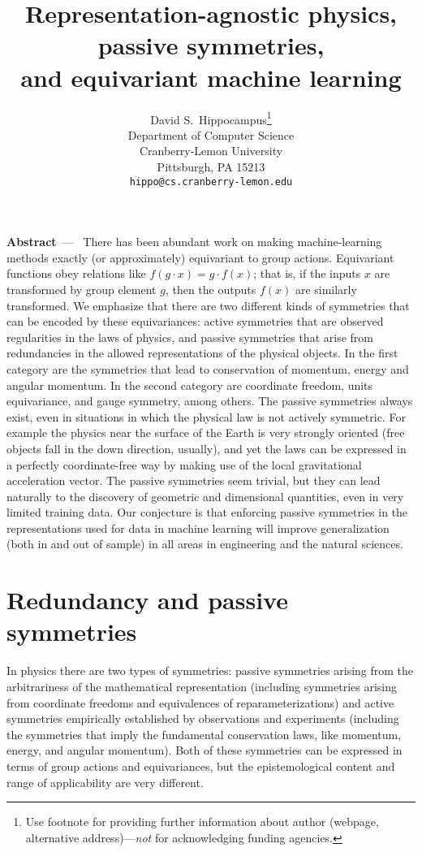 \documentclass{article}
\title{Representation-agnostic physics, passive symmetries,\\ and equivariant machine learning}
\author{%
  David S.~Hippocampus\thanks{Use footnote for providing further information
    about author (webpage, alternative address)---\emph{not} for acknowledging
    funding agencies.} \\
  Department of Computer Science\\
  Cranberry-Lemon University\\
  Pittsburgh, PA 15213 \\
  \texttt{hippo@cs.cranberry-lemon.edu} \\
}
\renewcommand{\paragraph}[1]{\par\textbf{#1}~---~}
\begin{document}
\maketitle

\paragraph{Abstract} 
There has been abundant work on making machine-learning methods exactly (or approximately) equivariant to group actions.
Equivariant functions obey relations like $f(g\cdot x) = g\cdot f(x)$; that is, if the inputs $x$ are transformed by group element $g$, then the outputs $f(x)$ are similarly transformed.
We emphasize that there are two different kinds of symmetries that can be encoded by these equivariances: active symmetries that are observed regularities in the laws of physics, and passive symmetries that arise from redundancies in the allowed representations of the physical objects. 
In the first category are the symmetries that lead to conservation of momentum, energy and angular momentum. In the second category are coordinate freedom, units equivariance, and gauge symmetry, among others.  
The passive symmetries always exist, even in situations in which the physical law is not actively symmetric.
For example the physics near the surface of the Earth is very strongly oriented (free objects fall in the down direction, usually), and yet the laws can be expressed in a perfectly coordinate-free way by making use of the local gravitational acceleration vector.
The passive symmetries seem trivial, but they can lead naturally to the discovery of geometric and dimensional quantities, even in very limited training data.
Our conjecture is that enforcing passive symmetries in the representations used for data in machine learning will improve generalization (both in and out of sample) in all areas in engineering and the natural sciences.

\section{Redundancy and passive symmetries}

In physics there are two types of symmetries: passive symmetries arising from the arbitrariness of the mathematical representation (including symmetries arising from coordinate freedoms and equivalences of reparameterizations) and active symmetries empirically established by observations and experiments (including the symmetries that imply the fundamental conservation laws, like momentum, energy, and angular momentum). Both of these symmetries can be expressed in terms of group actions and equivariances, but the epistemological content and range of applicability are very different. 
\end{document}
